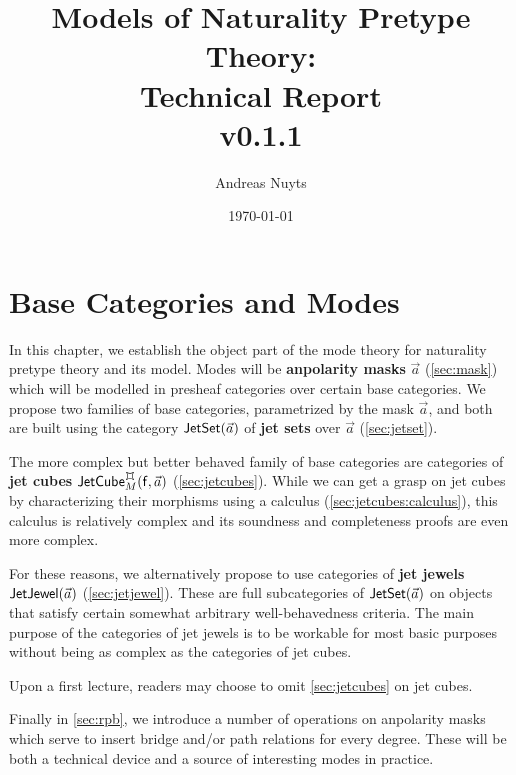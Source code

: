 \documentclass[a4paper]{memoir}
\newcommand{\thetitle}{Models of Naturality Pretype Theory: \\ Technical Report \\ v0.1.1}
\newcommand{\theauthors}{Andreas Nuyts}
\begin{document}
	\addtolength{\voffset}{-.5in}

\title{\thetitle}
\date{\today}
\author{\theauthors{}}
\maketitle

\pagebreak

\tableofcontents

\pagebreak

\chapter{Base Categories and Modes} \label{ch:modes}

In this chapter, we establish the object part of the mode theory for naturality pretype theory and its model.
Modes will be \textbf{anpolarity masks} $\vec a$ (\cref{sec:mask}) which will be modelled in presheaf categories over certain base categories.
We propose two families of base categories, parametrized by the mask $\vec a$, and both are built using the category $\mathsf{JetSet}(\vec a)$ of \textbf{jet sets} over $\vec a$ (\cref{sec:jetset}).

The more complex but better behaved family of base categories are categories of \textbf{jet cubes} $\jetcubefwd \mycubex M {\vec a}$ (\cref{sec:jetcubes}).
While we can get a grasp on jet cubes by characterizing their morphisms using a calculus (\cref{sec:jetcubes:calculus}), this calculus is relatively complex and its soundness and completeness proofs are even more complex.

For these reasons, we alternatively propose to use categories of \textbf{jet jewels} $\mathsf{JetJewel}(\vec a)$ (\cref{sec:jetjewel}). These are full subcategories of $\mathsf{JetSet}(\vec a)$ on objects that satisfy certain somewhat arbitrary well-behavedness criteria.
The main purpose of the categories of jet jewels is to be workable for most basic purposes without being as complex as the categories of jet cubes.

Upon a first lecture, readers may choose to omit \cref{sec:jetcubes} on jet cubes.

Finally in \cref{sec:rpb}, we introduce a number of operations on anpolarity masks which serve to insert bridge and/or path relations for every degree.
These will be both a technical device and a source of interesting modes in practice.
\end{document}

